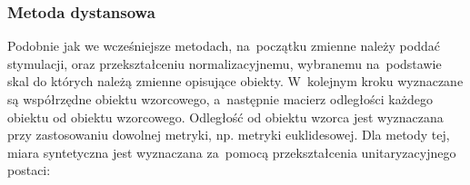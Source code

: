 \documentclass[12pt,a4paper]{report}
\begin{document}
%
%
%
%
%
%
%
%
%

\subsubsection{Metoda dystansowa}


Podobnie jak we wcześniejsze metodach, na~początku zmienne należy poddać stymulacji, oraz przekształceniu normalizacyjnemu, wybranemu na~podstawie skal do których należą zmienne opisujące obiekty. W~kolejnym kroku wyznaczane są współrzędne obiektu wzorcowego, a~następnie macierz odległości każdego obiektu od obiektu wzorcowego. Odległość od obiektu wzorca jest wyznaczana przy zastosowaniu dowolnej metryki, np. metryki euklidesowej. %
Dla metody tej, miara syntetyczna jest wyznaczana za~pomocą przekształcenia unitaryzacyjnego postaci: 
\end{document}
